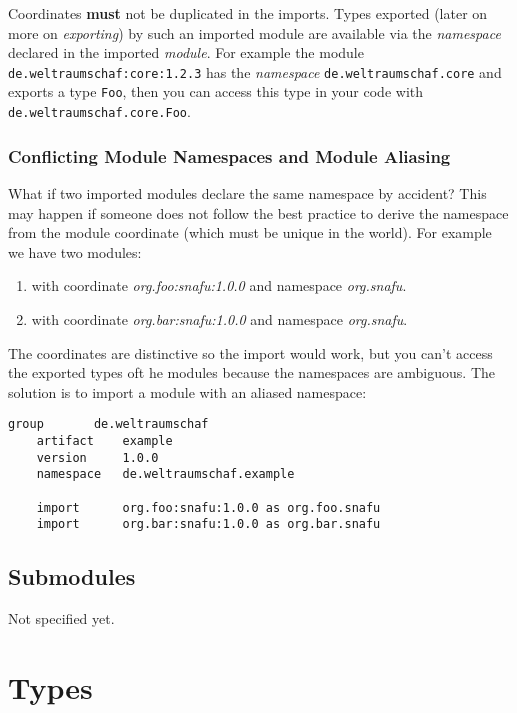 \documentclass[11pt,a4paper]{report}
\begin{document}
Coordinates \textbf{must} not be duplicated in the imports. Types exported (later on more on \textit{exporting}) by such an imported module are available via the \textit{namespace} declared in the imported \textit{module}. For example the module \texttt{de.weltraumschaf:core:1.2.3} has the \textit{namespace} \texttt{de.weltraumschaf.core} and exports a type \texttt{Foo}, then you can access this type in your code with \texttt{de.weltraumschaf.core.Foo}.

\subsubsection{Conflicting Module Namespaces and Module Aliasing}

What if two imported modules declare the same namespace by accident? This may happen if someone does not follow the best practice to derive the namespace from the module coordinate (which must be unique in the world). For example we have two modules:

\begin{enumerate}
    \item with coordinate \textit{org.foo:snafu:1.0.0} and namespace \textit{org.snafu}.
    \item with coordinate \textit{org.bar:snafu:1.0.0} and namespace \textit{org.snafu}.
\end{enumerate}

The coordinates are distinctive so the import would work, but you can't access the exported types oft he modules because the namespaces are ambiguous. The solution is to import a module with an aliased namespace:

\begin{lstlisting}[language=CayThe, title=Module manifest aliased namespaces]
    group       de.weltraumschaf
    artifact    example
    version     1.0.0
    namespace   de.weltraumschaf.example

    import      org.foo:snafu:1.0.0 as org.foo.snafu
    import      org.bar:snafu:1.0.0 as org.bar.snafu
\end{lstlisting}

\subsection{Submodules}

Not specified yet.

\section{Types}
\end{document}
